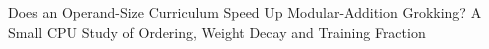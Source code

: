 Does an Operand-Size Curriculum Speed Up Modular-Addition Grokking? A Small CPU Study of Ordering, Weight Decay and Training Fraction
